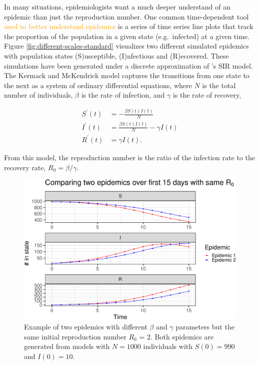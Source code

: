 \documentclass[
  shortnames]{jss}
\begin{document}
In many situations, epidemiologists want a much deeper understand of an
epidemic than just the reproduction number. One common time-dependent
tool \textcolor{orange}{used to better understand epidemics} is a series
of time series line plots that track the proportion of the population in
a given state (e.g.~infected) at a given time. Figure
\ref{fig:different-scales-standard} visualizes two different simulated
epidemics with population states (S)usceptible, (I)nfectious and
(R)ecovered. These simulations have been generated under a discrete
approximation of \citet{Kermack1927}'s SIR model. The Kermack and
McKendrick model captures the transitions from one state to the next as
a system of ordinary differential equations, where \(N\) is the total
number of individuals, \(\beta\) is the rate of infection, and
\(\gamma\) is the rate of recovery,

\begin{align}\label{eq:sir-ode}
    S^\prime(t) &= -\frac{\beta S(t)I(t)}{N} \\
    I^\prime(t) &= \frac{\beta S(t)I(t)}{N} - \gamma I(t) \nonumber\\
    R^\prime(t) &= \gamma I(t) \nonumber.
\end{align}

From this model, the reproduction number is the ratio of the infection
rate to the recovery rate, \(R_0 = \beta/\gamma\).

\begin{CodeChunk}
\begin{figure}[H]

{\centering \includegraphics{Figs/unnamed-chunk-2-1} 

}

\caption{\label{fig:different-scales-standard}Example of two epidemics with different $\beta$ and $\gamma$ parameters but the same initial reproduction number $R_0$ = 2.  Both epidemics are generated from models with $N= 1000$ individuals with $S(0) = 990$ and $I(0) = 10$.}\label{fig:unnamed-chunk-2}
\end{figure}
\end{CodeChunk}
\end{document}
